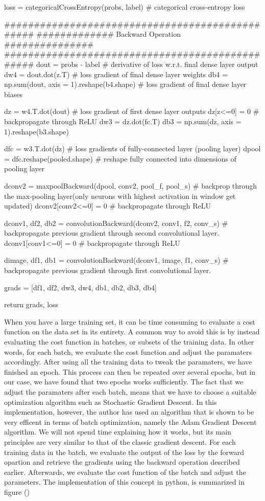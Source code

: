     loss = categoricalCrossEntropy(probs, label) # categorical cross-entropy loss
        
    ################################################
    ############# Backward Operation ###############
    ################################################
    dout = probs - label # derivative of loss w.r.t. final dense layer output
    dw4 = dout.dot(z.T) # loss gradient of final dense layer weights
    db4 = np.sum(dout, axis = 1).reshape(b4.shape) # loss gradient of final dense layer biases
    
    dz = w4.T.dot(dout) # loss gradient of first dense layer outputs 
    dz[z<=0] = 0 # backpropagate through ReLU 
    dw3 = dz.dot(fc.T)
    db3 = np.sum(dz, axis = 1).reshape(b3.shape)
    
    dfc = w3.T.dot(dz) # loss gradients of fully-connected layer (pooling layer)
    dpool = dfc.reshape(pooled.shape) # reshape fully connected into dimensions of pooling layer
    
    dconv2 = maxpoolBackward(dpool, conv2, pool_f, pool_s) # backprop through the max-pooling layer(only neurons with highest activation in window get updated)
    dconv2[conv2<=0] = 0 # backpropagate through ReLU
    
    dconv1, df2, db2 = convolutionBackward(dconv2, conv1, f2, conv_s) # backpropagate previous gradient through second convolutional layer.
    dconv1[conv1<=0] = 0 # backpropagate through ReLU
    
    dimage, df1, db1 = convolutionBackward(dconv1, image, f1, conv_s) # backpropagate previous gradient through first convolutional layer.
    
    grads = [df1, df2, dw3, dw4, db1, db2, db3, db4] 
    
    return grads, loss
\stoptyping

\startsection[title= Batch Optimization]
When you have a large training set, it can be time consuming to evaluate a cost function on the data set in its entirety.
A common way to avoid this is by instead evaluating the cost function in batches, or subsets of the training data.
In other words, for each batch, we evaluate the cost function and adjust the paramaters accordingly. 
After using all the training data to tweak the paramaters, we have finished an epoch.
This process can then be repeated over several epochs, but in our case, we have found that two epochs works sufficiently.
The fact that we adjust the paramaters after each batch, means that we have to choose a suitable optimization algorithm such as Stochastic Gradient Descent.
In this implementation, however, the author has used an algorithm that is shown to be very efficent in terms of batch optimization, namely the Adam Gradient Descent algorithm.
We will not spend time explaining how it works, but its main principles are very similar to that of the classic gradient descent.
For each training data in the batch, we evaluate the output of the loss by the forward opartion and retrieve the gradients using the backward operation described earlier. 
Afterwards, we evaluate the cost function of the batch and adjust the parameters.
The implementation of this concept in python, is summarized in figure ()



